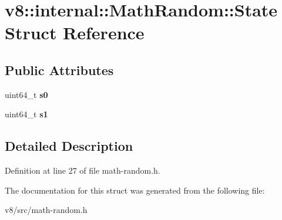 \hypertarget{structv8_1_1internal_1_1MathRandom_1_1State}{}\section{v8\+:\+:internal\+:\+:Math\+Random\+:\+:State Struct Reference}
\label{structv8_1_1internal_1_1MathRandom_1_1State}
\subsection*{Public Attributes}
\begin{DoxyCompactItemize}
\item 
\mbox{\label{structv8_1_1internal_1_1MathRandom_1_1State_a9aeecab366225450f2e2913f8d0109aa}} 
uint64\+\_\+t {\bfseries s0}
\item 
\mbox{\label{structv8_1_1internal_1_1MathRandom_1_1State_aea11efb1c144b95212ad41d61a6b60aa}} 
uint64\+\_\+t {\bfseries s1}
\end{DoxyCompactItemize}


\subsection{Detailed Description}


Definition at line 27 of file math-\/random.\+h.



The documentation for this struct was generated from the following file\+:\begin{DoxyCompactItemize}
\item 
v8/src/math-\/random.\+h\end{DoxyCompactItemize}
